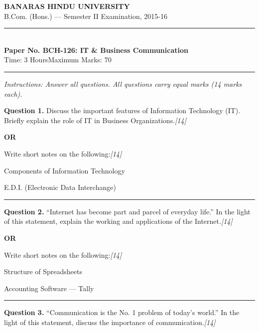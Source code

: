 \documentclass[11pt,a4paper]{article}
\newcommand{\pts}[1]{\hfill   \textit{[#1]}}
\begin{document}
\begin{center}
  {\large\bfseries BANARAS HINDU UNIVERSITY}\\[2pt]
  {\normalsize B.Com. (Hons.) --- Semester II Examination, 2015-16}\\[6pt]
  \rule{0.8\linewidth}{0.5pt}\\[6pt]
  {\large\bfseries Paper No. BCH-126: IT \& Business Communication}\\[4pt]
  {\normalsize Time: 3 Hours\hfill Maximum Marks: 70}
\end{center}

\rule{\linewidth}{0.4pt}

\smallskip



\noindent   \textit{Instructions: Answer all questions. All questions carry equal marks (14 marks each).}

\bigskip




\noindent   \textbf{Question 1.}
Discuss the important features of Information Technology (IT). Briefly explain the role of IT in Business Organizations.\pts{14}

\centerline{   \textbf{OR}}

Write short notes on the following:\pts{14}

\begin{parts}
  \item Components of Information Technology
  \item E.D.I. (Electronic Data Interchange)
\end{parts}

\medskip\rule{\linewidth}{0.2pt}




\noindent   \textbf{Question 2.}
``Internet has become part and parcel of everyday life.'' In the light of this statement, explain the working and applications of the Internet.\pts{14}

\centerline{   \textbf{OR}}

Write short notes on the following:\pts{14}

\begin{parts}
  \item Structure of Spreadsheets
  \item Accounting Software --- Tally
\end{parts}

\medskip\rule{\linewidth}{0.2pt}




\noindent   \textbf{Question 3.}
``Communication is the No. 1 problem of today's world.'' In the light of this statement, discuss the importance of communication.\pts{14}
\end{document}
